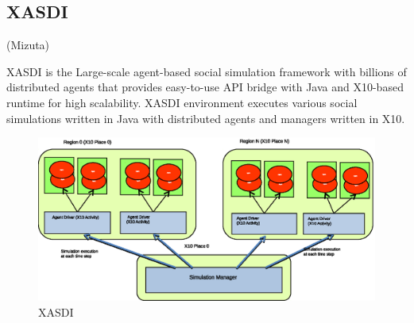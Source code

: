 \subsection{XASDI}
\label{ss:XASDI}
(Mizuta)

XASDI is the Large-scale agent-based social simulation framework with
billions of distributed agents that provides easy-to-use API bridge
with Java and X10-based runtime for high scalability. XASDI
environment executes various social simulations written in Java with
distributed agents and managers written in X10.

\begin{figure}
  \centering
  \includegraphics[width=.8\linewidth]{Figs.noda/figure-04.xasdi.eps}
  \caption{XASDI}
  \label{fig:Figs.noda/figure-04.xasdi.eps}
\end{figure}
